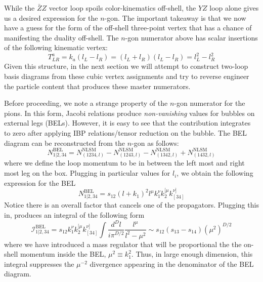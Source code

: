 \documentclass[11pt,letter]{article}
\def\be{\begin{equation}}
\def\ee{\end{equation}}
\begin{document}
While the $\bar{Z}Z$ vector loop spoils color-kinematics off-shell, the $Y\!Z$ loop alone gives us a desired expression for the $n$-gon. The important takeaway is that we now have a guess for the form of the off-shell three-point vertex that has a chance of manifesting the duality off-shell. The $n$-gon numerator above has scalar insertions of the following kinematic vertex:
\be
T^{a}_{LR} = k_a(l_L-l_{R}) = (l_L+l_{R}) (l_L-l_{R})  = l_L^2-l_{R}^2 
\ee
Given this structure, in the next section we will attempt to construct two-loop basis diagrams from these cubic vertex assignments and try to reverse engineer the particle content that produces these master numerators.

Before proceeding, we note a strange property of the $n$-gon numerator for the pions. In this form, Jacobi relations produce \textit{non-vanishing} values for bubbles on external legs (BELs). However, it is easy to see that the contribution integrates to zero after applying IBP relations/tensor reduction on the bubble. The BEL diagram can be reconstructed from the $n$-gon as follows:
\be
N^{\text{BEL}}_{1|2,34} = N^{\text{NLSM}}_{(1234,l)}-N^{\text{NLSM}}_{(1243,l)}-N^{\text{NLSM}}_{(1342,l)}+N^{\text{NLSM}}_{(1432,l)}
\ee
where we define the loop momentum to be in between the left most and right most leg on the box. Plugging in particular values for $l_i$, we obtain the following expression for the BEL
\be
N^{\text{BEL}}_{1|2,34} = s_{12} (l+k_1)^2 l^{\mu} k_1^{\nu} k_2^{[\mu} k_{[34]}^{\nu]} 
\ee
Notice there is an overall factor that cancels one of the propagators. Plugging this in, produces an integral of the following form
\be
\mathcal{I}^{\text{BEL}}_{1|2,34} = s_{12} k_1^{\nu} k_2^{[\mu} k_{[34]}^{\nu]} \int \frac{d^D l}{i\pi^{D/2}} \frac{l^\mu }{l^2-\mu^2} \sim   s_{12}(s_{13}-s_{14}) (\mu^2)^{D/2}
\ee
where we have introduced a mass regulator that will be proportional the the on-shell momentum inside the BEL, $\mu^2 \equiv k_1^2$. Thus, in large enough dimension, this integral suppresses the $\mu^{-2}$ divergence appearing in the denominator of the BEL diagram. 


\end{document}
